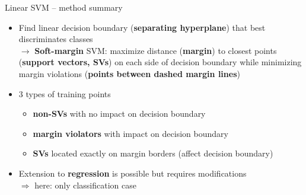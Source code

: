 \begin{vbframe}{Linear SVM -- method summary}

   
\medskip


\begin{itemize}
  \item Find linear decision boundary (\textbf{separating hyperplane}) that 
  best discriminates classes\\
  $\rightarrow$ \textbf{Soft-margin} SVM: maximize distance (\textbf{margin}) to closest points (\textbf{support vectors, SVs}) on each side of decision boundary while minimizing margin violations (\textbf{points between dashed margin lines})
\end{itemize}

\begin{minipage}[T]{0.7\linewidth}

\begin{itemize}
  \item 3 types of training points
  \begin{itemize}
    \item \textbf{non-SVs} with no impact on decision boundary
    \item \textbf{margin violators} with impact on decision boundary
    \item \textbf{SVs} located exactly on margin borders (affect decision boundary)
  \end{itemize}
  \item Extension to \textbf{regression} is possible but requires modifications 
  \\ $\Rightarrow$ here: only classification case
\end{itemize}


\end{minipage}
\end{vbframe}
